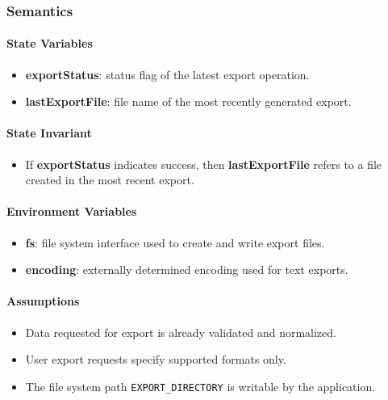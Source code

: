 \documentclass[12pt, titlepage]{article}
\begin{document}
\begin{itemize}
  \subsubsection{Semantics}

  \paragraph{State Variables}
  \begin{itemize}
    \item \textbf{exportStatus}: status flag of the latest export operation.
    \item \textbf{lastExportFile}: file name of the most recently generated export.
  \end{itemize}

  \paragraph{State Invariant}
  \begin{itemize}
    \item If \textbf{exportStatus} indicates success, then \textbf{lastExportFile} refers to a file created in the most recent export.
  \end{itemize}

  \paragraph{Environment Variables}
  \begin{itemize}
    \item \textbf{fs}: file system interface used to create and write export files.
    \item \textbf{encoding}: externally determined encoding used for text exports.
  \end{itemize}

  \paragraph{Assumptions}
  \begin{itemize}
    \item Data requested for export is already validated and normalized.
    \item User export requests specify supported formats only.
    \item The file system path \texttt{EXPORT\_DIRECTORY} is writable by the application.
  \end{itemize}


\end{itemize}
\end{document}
